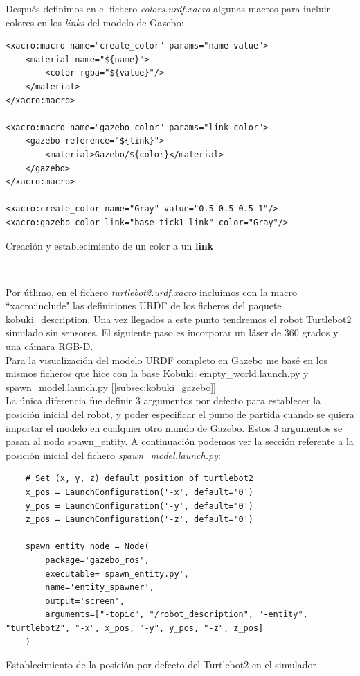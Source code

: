 Después definimos en el fichero \textit{colors.urdf.xacro} algunas macros para incluir colores en los \textit{links} del modelo de Gazebo:\\
\begin{code}[H]
\begin{lstlisting}
<xacro:macro name="create_color" params="name value">
	<material name="${name}">
		<color rgba="${value}"/>
	</material>
</xacro:macro>

<xacro:macro name="gazebo_color" params="link color">
	<gazebo reference="${link}">
		<material>Gazebo/${color}</material>
	</gazebo>
</xacro:macro>

<xacro:create_color name="Gray" value="0.5 0.5 0.5 1"/>
<xacro:gazebo_color link="base_tick1_link" color="Gray"/>
\end{lstlisting}
\caption{Creación y establecimiento de un color a un \textbf{link}}
\label{fig:creacion_color_link}
\end{code}\

Por útlimo, en el fichero \textit{turtlebot2.urdf.xacro} incluimos con la macro ``xacro:include" las definiciones URDF de los ficheros del paquete kobuki\_description. Una vez llegados a este punto tendremos el robot Turtlebot2 simulado sin sensores. El siguiente paso es incorporar un láser de 360 grados y una cámara RGB-D.\\

Para la visualización del modelo URDF completo en Gazebo me basé en los mismos ficheros que hice con la base Kobuki: empty\_world.launch.py y spawn\_model.launch.py [\ref{subsec:kobuki_gazebo}]\\

La única diferencia fue definir 3 argumentos por defecto para establecer la posición inicial del robot, y poder especificar el punto de partida cuando se quiera importar el modelo en cualquier otro mundo de Gazebo. Estos 3 argumentos se pasan al nodo spawn\_entity. A continuación podemos ver la sección referente a la posición inicial del fichero \textit{spawn\_model.launch.py}:\\

\begin{code}[H]
\begin{lstlisting}
	# Set (x, y, z) default position of turtlebot2
	x_pos = LaunchConfiguration('-x', default='0')
	y_pos = LaunchConfiguration('-y', default='0')
	z_pos = LaunchConfiguration('-z', default='0')
	
	spawn_entity_node = Node(
		package='gazebo_ros',
		executable='spawn_entity.py',
		name='entity_spawner',
		output='screen',
		arguments=["-topic", "/robot_description", "-entity", "turtlebot2", "-x", x_pos, "-y", y_pos, "-z", z_pos]
	)
\end{lstlisting}
\caption{Establecimiento de la posición por defecto del Turtlebot2 en el simulador}
\label{cod:posicion_defecto_turtlebot2_simulador}
\end{code}\

